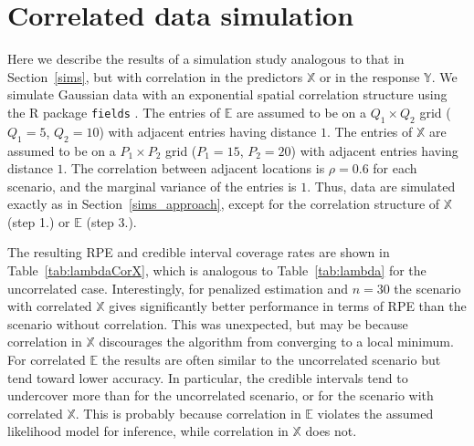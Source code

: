 \documentclass[12pt]{article}
\def\XX{\mathbb{X}}
\def\YY{\mathbb{Y}}
\def\EE{\mathbb{E}}
\begin{document}
\section{Correlated data simulation}   
\label{corSim}   
 Here we describe the results of a simulation study analogous to that in Section~\ref{sims}, but with correlation in the predictors $\XX$ or in the response $\YY$.  We simulate Gaussian data with an exponential spatial correlation structure using the R package {\tt fields} \citep{fields}. The entries of $\EE$ are assumed to be on a $Q_1 \times Q_2$ grid ($Q_1=5$, $Q_2=10$) with adjacent entries having distance $1$.  The entries of $\XX$ are assumed to be on a $P_1 \times P_2$ grid ($P_1=15$, $P_2=20$) with adjacent entries having distance $1$. The correlation between adjacent locations is $\rho=0.6$ for each scenario, and the marginal variance of the entries is $1$.  Thus, data are simulated exactly as in Section~\ref{sims_approach}, except for the correlation structure of $\XX$ (step 1.) or $\EE$ (step 3.).
 
The resulting RPE and credible interval coverage rates are shown in Table~\ref{tab:lambdaCorX}, which is analogous to Table~\ref{tab:lambda} for the uncorrelated case.  Interestingly, for penalized estimation and $n=30$ the scenario with correlated $\XX$  gives significantly better performance in terms of RPE than the scenario without correlation.  This was unexpected, but may be because correlation in $\XX$ discourages the algorithm from converging to a local minimum.  For correlated $\EE$ the results are often similar to the uncorrelated scenario but tend toward lower accuracy.  In particular, the credible intervals tend to undercover more than for the uncorrelated scenario, or for the scenario with correlated $\XX$. This is probably because correlation in $\EE$ violates the assumed likelihood model for inference, while correlation in $\XX$ does not.             
   
\end{document}
